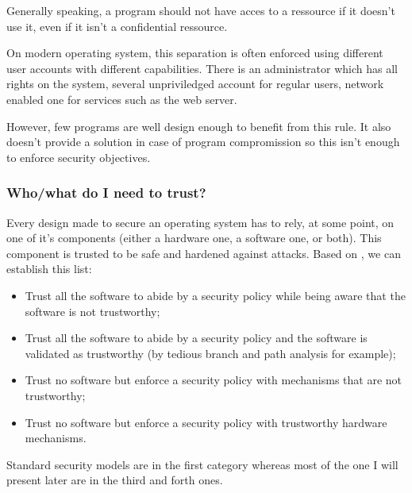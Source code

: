 \documentclass[pdftex,a4paper,titlepage,11pt]{article}
\begin{document}
\bigskip

Generally speaking, a program should not have acces to a ressource if it doesn't use it, even if it isn't a confidential ressource.

\bigskip

On modern operating system, this separation is often enforced using different user accounts with different capabilities. There is an administrator which has all rights on the system, several unpriviledged account for regular users, network enabled one for services such as the web server.

\bigskip

However, few programs are well design enough to benefit from this rule. It also doesn't provide a solution in case of program compromission so this isn't enough to enforce security objectives.


\subsubsection{Who/what do I need to trust?}

Every design made to secure an operating system has to rely, at some point, on one of it's components (either a hardware one, a software one, or both). This component is trusted to be safe and hardened against attacks. Based on \cite{WCS}, we can establish this list:

\begin{itemize}
	\item Trust all the software to abide by a security policy while being aware that the software is not trustworthy;

	\item Trust all the software to abide by a security policy and the software is validated as trustworthy (by tedious branch and path analysis for example);

	\item Trust no software but enforce a security policy with mechanisms that are not trustworthy;

	\item Trust no software but enforce a security policy with trustworthy hardware mechanisms.
\end{itemize}

\smallskip

Standard security models are in the first category whereas most of the one I will present later are in the third and forth ones.
\end{document}
